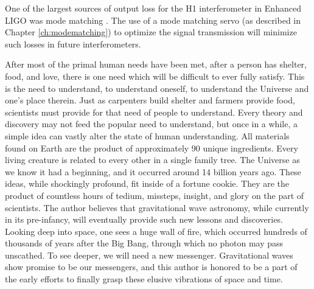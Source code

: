 One of the largest sources of output loss for the H1 interferometer in Enhanced LIGO was mode matching \cite{Tobin}. %
The use of a mode matching servo (as described in Chapter \ref{ch:modematching}) to optimize the signal transmission will minimize such losses in future interferometers.

After most of the primal human needs have been met, after a person has shelter, food, and love, there is one need which will be difficult to ever fully satisfy. %
This is the need to understand, to understand oneself, to understand the Universe and one's place therein. %
Just as carpenters build shelter and farmers provide food, scientists must provide for that need of people to understand. %
Every theory and discovery may not feed the popular need to understand, but once in a while, a simple idea can vastly alter the state of human understanding. %
All materials found on Earth are the product of approximately 90 unique ingredients. %
Every living creature is related to every other in a single family tree. %
The Universe as we know it had a beginning, and it occurred around 14 billion years ago. %
These ideas, while shockingly profound, fit inside of a fortune cookie. %
They are the product of countless hours of tedium, missteps, insight, and glory on the part of scientists. %
The author believes that gravitational wave astronomy, while currently in its pre-infancy, will eventually provide such new lessons and discoveries. %
Looking deep into space, one sees a huge wall of fire, which occurred hundreds of thousands of years after the Big Bang, through which no photon may pass unscathed. %
To see deeper, we will need a new messenger. %
Gravitational waves show promise to be our messengers, and this author is honored to be a part of the early efforts to finally grasp these elusive vibrations of space and time.
